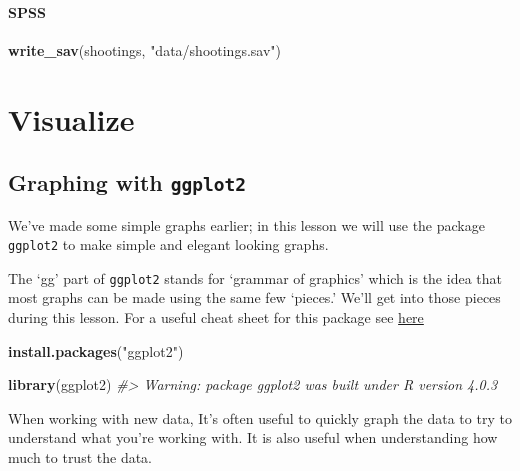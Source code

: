 \documentclass[
  12pt,
]{book}
\newenvironment{Shaded}{\begin{snugshade}}{\end{snugshade}}
\newcommand{\CommentTok}[1]{\textcolor[rgb]{0.37,0.37,0.37}{\textit{#1}}}
\newcommand{\KeywordTok}[1]{\textcolor[rgb]{0.27,0.27,0.27}{\textbf{#1}}}
\newcommand{\NormalTok}[1]{#1}
\newcommand{\StringTok}[1]{\textcolor[rgb]{0.5,0.5,0.5}{#1}}
\begin{document}
\hypertarget{spss-1}{%
\subsection{SPSS}\label{spss-1}}

\begin{Shaded}
\begin{Highlighting}[]
\KeywordTok{write\_sav}\NormalTok{(shootings, }\StringTok{"data/shootings.sav"}\NormalTok{)}
\end{Highlighting}
\end{Shaded}

\hypertarget{part-visualize}{%
\part{Visualize}\label{part-visualize}}

\hypertarget{graphing-intro}{%
\chapter{\texorpdfstring{Graphing with \texttt{ggplot2}}{Graphing with ggplot2}}\label{graphing-intro}}

We've made some simple graphs earlier; in this lesson we will use the package \texttt{ggplot2} to make simple and elegant looking graphs.

The `gg' part of \texttt{ggplot2} stands for `grammar of graphics' which is the idea that most graphs can be made using the same few `pieces.' We'll get into those pieces during this lesson. For a useful cheat sheet for this package see \href{https://www.rstudio.com/wp-content/uploads/2015/03/ggplot2-cheatsheet.pdf}{here}

\begin{Shaded}
\begin{Highlighting}[]
\KeywordTok{install.packages}\NormalTok{(}\StringTok{"ggplot2"}\NormalTok{)}
\end{Highlighting}
\end{Shaded}

\begin{Shaded}
\begin{Highlighting}[]
\KeywordTok{library}\NormalTok{(ggplot2)}
\CommentTok{\#\textgreater{} Warning: package \textquotesingle{}ggplot2\textquotesingle{} was built under R version 4.0.3}
\end{Highlighting}
\end{Shaded}

When working with new data, It's often useful to quickly graph the data to try to understand what you're working with. It is also useful when understanding how much to trust the data.
\end{document}
